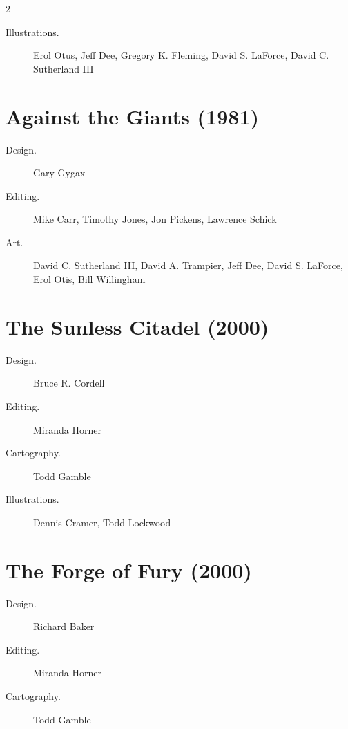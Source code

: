 \documentclass[10pt,a4paper,twoside,bg=print,twocolumn,openany,nodeprecatedcode]{dndbook}
\begin{document}
\begin{description}
\begin{multicols}{2}
\begin{description}
\item[Illustrations.]
Erol Otus, Jeff Dee, Gregory K. Fleming, David S. LaForce, David C. Sutherland III

\end{description}

\section{Against the Giants (1981)}

\begin{description}
\item[Design.]
Gary Gygax

\item[Editing.]
Mike Carr, Timothy Jones, Jon Pickens, Lawrence Schick

\item[Art.]
David C. Sutherland III, David A. Trampier, Jeff Dee, David S. LaForce, Erol Otis, Bill Willingham

\end{description}

\section{The Sunless Citadel (2000)}

\begin{description}
\item[Design.]
Bruce R. Cordell

\item[Editing.]
Miranda Horner

\item[Cartography.]
Todd Gamble

\item[Illustrations.]
Dennis Cramer, Todd Lockwood

\end{description}

\section{The Forge of Fury (2000)}

\begin{description}
\item[Design.]
Richard Baker

\item[Editing.]
Miranda Horner

\item[Cartography.]
Todd Gamble


\end{description}
\end{multicols}
\end{description}
\end{document}
